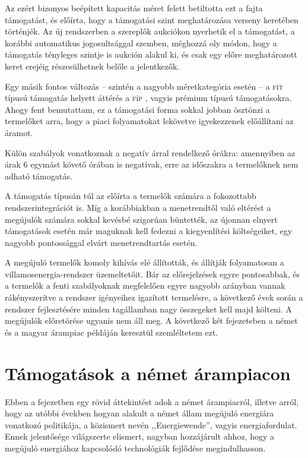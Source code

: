 \documentclass[twoside, magyar, showtrims]{corvinusphd}
\theoremstyle{plain}
\theoremstyle{remark}
\theoremstyle{definition}
\newcommand{\fit}{\textsc{f}i\textsc{t}\index{\textsc{f}i\textsc{t}} }
\newcommand{\fip}{\textsc{f}i\textsc{p}\index{\textsc{f}i\textsc{p}} }
\begin{document}
Az  ezért bizonyos beépített kapacitás
méret felett betiltotta ezt a fajta támogatást,
és előírta, hogy a támogatási szint
meghatározása verseny keretében történjék.
Az új rendszerben a szereplők aukciókon nyerhetik
el a támogatást, a korábbi automatikus jogosultsággal
szemben, méghozzá oly módon, hogy a támogatás
tényleges szintje is aukción alakul ki, 
és csak egy előre meghatározott keret erejéig
részesülhetnek belőle a jelentkezők.

Egy másik fontos változás -- szintén a nagyobb
méretkategória esetén -- a \fit típusú támogatás
helyett áttérés a \fip, vagyis prémium
típusú támogatásokra. Ahogy fent bemutattam,
ez a támogatási forma sokkal jobban ösztönzi a
termelőket arra, hogy a piaci folyamatokat
lekövetve igyekezzenek előállítani az áramot.

Külön szabályok vonatkoznak a negatív árral
rendelkező órákra: amennyiben az árak 6 egymást
követő órában is negatívak, erre az időszakra
a termelőknek nem adható támogatás. 

A támogatás típusán túl az 
előírta a termelők számára a fokozottabb
rendszerintegrációt is. Míg a korábbiakban
a menetrendtől való eltérést a megújulók számára
sokkal kevésbé szigorúan büntették,
az újonnan elnyert támogatások esetén már
maguknak kell fedezni a kiegyenlítési költségeiket,
egy nagyobb pontossággal elvárt menetrendtartás esetén.

A megújuló termelők komoly kihívás elé állították, 
és állítják folyamatosan a villamosenergia-rendszer üzemeltetőit.
Bár az előrejelzések egyre pontosabbak, és a termelők a fenti szabályoknak
megfelelően egyre nagyobb arányban vannak rákényszerítve
a rendszer igényeihez igazított termelésre, a következő évek során
a rendszer fejlesztésére minden tagállamban nagy összegeket kell majd költeni.
A megújulók előretörése ugyanis nem áll meg. A következő
két fejezeteben a német és a magyar árampiac példáján
keresztül szemléltetem ezt.

\section{Támogatások a német árampiacon}

Ebben a fejezetben egy rövid áttekintést adok
a német árampiacról, illetve arról, hogy az utóbbi 
években hogyan alakult a német állam megújuló
energiára vonatkozó politikája,
a közismert nevén ,,Energiewende'', vagyis energiafordulat.
Ennek jelentősége világszerte elismert, nagyban
hozzájárult ahhoz, hogy a megújuló energiához
kapcsolódó technológiák fejlődése megindulhasson.
\end{document}
